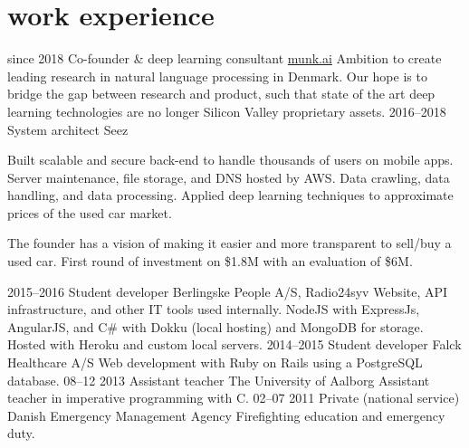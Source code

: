 \documentclass[]{friggeri-cv}
\begin{document}
\section{work experience}

\begin{entrylist}
  \entry
    {since 2018}
    {Co-founder \& deep learning consultant}
    {\href{http://www.munk.ai/}{munk.ai}}
    {
      Ambition to create leading research in natural language processing in Denmark.
      Our hope is to bridge the gap between research and product, such that state of the art deep learning technologies are no longer Silicon Valley proprietary assets.
    }
  \entry
    {2016--2018}
    {System architect}
    {Seez}
    {
      Built scalable and secure back-end to handle thousands of users on mobile apps.
      Server maintenance, file storage, and DNS hosted by AWS.
      Data crawling, data handling, and data processing.
      Applied deep learning techniques to approximate prices of the used car market.
    
      The founder has a vision of making it easier and more transparent to sell/buy a used car.
      First round of investment on \$1.8M with an evaluation of \$6M.    
	  }
  \entry
    {2015--2016}
    {Student developer}
    {Berlingske People A/S, Radio24syv}
    {
      Website, API infrastructure, and other IT tools used internally. 
      NodeJS with ExpressJs, AngularJS, and C\# with Dokku (local hosting) and MongoDB for storage.
      Hosted with Heroku and custom local servers.
    }
  \entry
    {2014--2015}
    {Student developer}
    {Falck Healthcare A/S}
    {
      Web development with Ruby on Rails using a PostgreSQL database.
    }
  \entry
    {08–12 2013}
    {Assistant teacher}
    {The University of Aalborg}
    {Assistant teacher in imperative programming with C.}
  \entry
    {02–07 2011}
    {Private (national service)}
    {Danish Emergency Management Agency}
    {Firefighting education and emergency duty.}
\end{entrylist}
\end{document}
